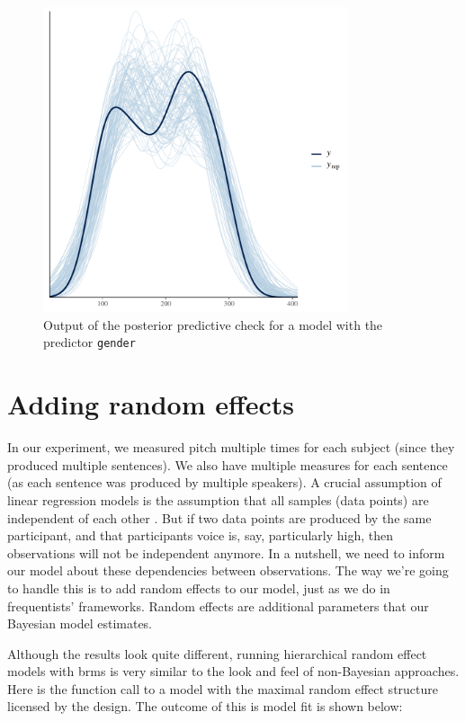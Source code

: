 \documentclass[nobib]{tufte-handout}
\begin{document}
\begin{figure}[]
  \centering
    \includegraphics[width = 0.8\textwidth]{pics/pp_check_FE.pdf}
    \caption{Output of the posterior predictive check for a model with the predictor \texttt{gender}}
    \label{fig:coefficients_table}
\end{figure}


\section{Adding random effects}

In our experiment, we measured pitch multiple times for each subject (since they produced
multiple sentences). We also have multiple measures for each sentence (as each sentence was
produced by multiple speakers). A crucial assumption of linear regression models is the
assumption that all samples (data points) are independent of each other
\citep[e.g.][]{clark1973language}. But if two data points are produced by the same participant,
and that participants voice is, say, particularly high, then observations will not be
independent anymore. In a nutshell, we need to inform our model about these dependencies between observations. The way we’re going to handle this is to add random effects to our model, just as we do in frequentists' frameworks. Random effects are additional parameters that our Bayesian model estimates.

Although the results look quite different, running hierarchical random effect models with \textrm{brms} is very similar to the look and feel of non-Bayesian approaches. Here is the function call to a model with the maximal random effect structure licensed by the design.
The outcome of this is model fit is shown below:
\end{document}
